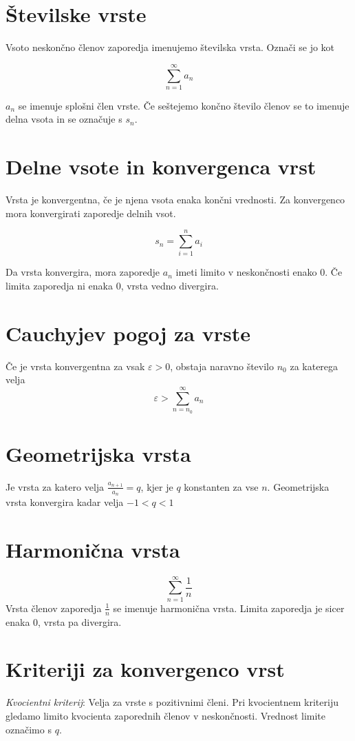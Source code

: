 \documentclass[12pt]{report}
\begin{document}
\section*{Številske vrste}
Vsoto neskončno členov zaporedja imenujemo številska vrsta. Označi se jo kot

\[\sum_{n=1}^{\infty}a_n\]
 
$a_n$ se imenuje splošni člen vrste. Če seštejemo končno število členov se to imenuje delna vsota in se označuje s $s_n$.

\section*{Delne vsote in konvergenca vrst}
Vrsta je konvergentna, če je njena vsota enaka končni vrednosti. Za konvergenco mora konvergirati zaporedje delnih vsot.

\[s_n=\sum_{i=1}^{n}a_i\]

Da vrsta konvergira, mora zaporedje $a_n$ imeti limito v neskončnosti enako 0. Če limita zaporedja ni enaka 0, vrsta vedno divergira.

\section*{Cauchyjev pogoj za vrste}
Če je vrsta konvergentna za vsak $\varepsilon>0$, obstaja naravno število $n_0$ za katerega velja 
 \[\varepsilon > \sum_{n=n_0}^{\infty}a_n\]

\section*{Geometrijska vrsta}
Je vrsta za katero velja $ \frac{a_{n+1}}{a_n}=q$, kjer je $q$ konstanten za vse $n$. Geometrijska vrsta konvergira kadar velja $-1<q<1$

\section*{Harmonična vrsta}
 
 \[\sum_{n=1}^{\infty}\frac{1}{n}\]
Vrsta členov zaporedja $\frac{1}{n}$ se imenuje harmonična vrsta. Limita zaporedja je sicer enaka 0, vrsta pa divergira.

\section*{Kriteriji za konvergenco vrst}
\emph{Kvocientni kriterij}: Velja za vrste s pozitivnimi členi. Pri kvocientnem kriteriju gledamo limito kvocienta zaporednih členov v neskončnosti. Vrednost limite označimo s $q$.
 
\end{document}
